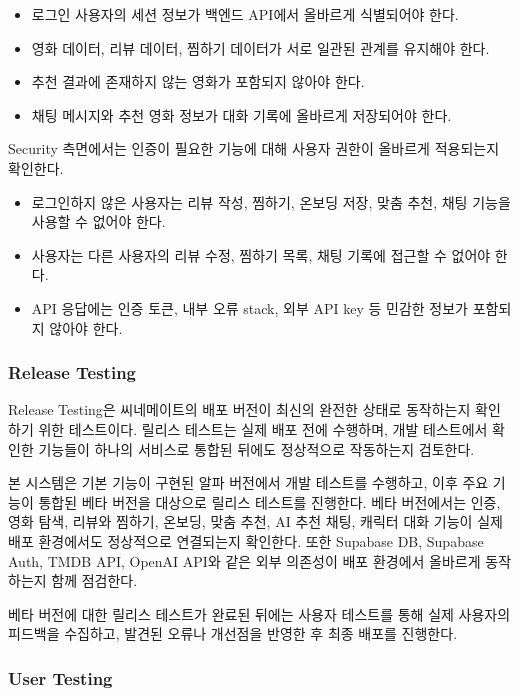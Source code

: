 \documentclass[11pt,a4paper]{article}
\providecommand{\tightlist}{%
  \setlength{\itemsep}{0.25em}\setlength{\parskip}{0.1em}}
\begin{document}
\begin{itemize}
\tightlist
\item
  로그인 사용자의 세션 정보가 백엔드 API에서 올바르게 식별되어야 한다.
\item
  영화 데이터, 리뷰 데이터, 찜하기 데이터가 서로 일관된 관계를 유지해야 한다.
\item
  추천 결과에 존재하지 않는 영화가 포함되지 않아야 한다.
\item
  채팅 메시지와 추천 영화 정보가 대화 기록에 올바르게 저장되어야 한다.
\end{itemize}

Security 측면에서는 인증이 필요한 기능에 대해 사용자 권한이 올바르게 적용되는지 확인한다.

\begin{itemize}
\tightlist
\item
  로그인하지 않은 사용자는 리뷰 작성, 찜하기, 온보딩 저장, 맞춤 추천, 채팅 기능을 사용할 수 없어야 한다.
\item
  사용자는 다른 사용자의 리뷰 수정, 찜하기 목록, 채팅 기록에 접근할 수 없어야 한다.
\item
  API 응답에는 인증 토큰, 내부 오류 stack, 외부 API key 등 민감한 정보가 포함되지 않아야 한다.
\end{itemize}

\hypertarget{release-testing}{%
\subsubsection{Release Testing}\label{release-testing}}

Release Testing은 씨네메이트의 배포 버전이 최신의 완전한 상태로 동작하는지 확인하기 위한 테스트이다. 릴리스 테스트는 실제 배포 전에 수행하며, 개발 테스트에서 확인한 기능들이 하나의 서비스로 통합된 뒤에도 정상적으로 작동하는지 검토한다.

본 시스템은 기본 기능이 구현된 알파 버전에서 개발 테스트를 수행하고, 이후 주요 기능이 통합된 베타 버전을 대상으로 릴리스 테스트를 진행한다. 베타 버전에서는 인증, 영화 탐색, 리뷰와 찜하기, 온보딩, 맞춤 추천, AI 추천 채팅, 캐릭터 대화 기능이 실제 배포 환경에서도 정상적으로 연결되는지 확인한다. 또한 Supabase DB, Supabase Auth, TMDB API, OpenAI API와 같은 외부 의존성이 배포 환경에서 올바르게 동작하는지 함께 점검한다.

베타 버전에 대한 릴리스 테스트가 완료된 뒤에는 사용자 테스트를 통해 실제 사용자의 피드백을 수집하고, 발견된 오류나 개선점을 반영한 후 최종 배포를 진행한다.

\hypertarget{user-testing}{%
\subsubsection{User Testing}\label{user-testing}}
\end{document}
